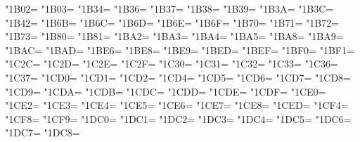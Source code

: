 \XeTeXcharclass"1B02=\KclassNum
\XeTeXcharclass"1B03=\KclassNum
\XeTeXcharclass"1B34=\KclassNum
\XeTeXcharclass"1B36=\KclassNum
\XeTeXcharclass"1B37=\KclassNum
\XeTeXcharclass"1B38=\KclassNum
\XeTeXcharclass"1B39=\KclassNum
\XeTeXcharclass"1B3A=\KclassNum
\XeTeXcharclass"1B3C=\KclassNum
\XeTeXcharclass"1B42=\KclassNum
\XeTeXcharclass"1B6B=\KclassNum
\XeTeXcharclass"1B6C=\KclassNum
\XeTeXcharclass"1B6D=\KclassNum
\XeTeXcharclass"1B6E=\KclassNum
\XeTeXcharclass"1B6F=\KclassNum
\XeTeXcharclass"1B70=\KclassNum
\XeTeXcharclass"1B71=\KclassNum
\XeTeXcharclass"1B72=\KclassNum
\XeTeXcharclass"1B73=\KclassNum
\XeTeXcharclass"1B80=\KclassNum
\XeTeXcharclass"1B81=\KclassNum
\XeTeXcharclass"1BA2=\KclassNum
\XeTeXcharclass"1BA3=\KclassNum
\XeTeXcharclass"1BA4=\KclassNum
\XeTeXcharclass"1BA5=\KclassNum
\XeTeXcharclass"1BA8=\KclassNum
\XeTeXcharclass"1BA9=\KclassNum
\XeTeXcharclass"1BAC=\KclassNum
\XeTeXcharclass"1BAD=\KclassNum
\XeTeXcharclass"1BE6=\KclassNum
\XeTeXcharclass"1BE8=\KclassNum
\XeTeXcharclass"1BE9=\KclassNum
\XeTeXcharclass"1BED=\KclassNum
\XeTeXcharclass"1BEF=\KclassNum
\XeTeXcharclass"1BF0=\KclassNum
\XeTeXcharclass"1BF1=\KclassNum
\XeTeXcharclass"1C2C=\KclassNum
\XeTeXcharclass"1C2D=\KclassNum
\XeTeXcharclass"1C2E=\KclassNum
\XeTeXcharclass"1C2F=\KclassNum
\XeTeXcharclass"1C30=\KclassNum
\XeTeXcharclass"1C31=\KclassNum
\XeTeXcharclass"1C32=\KclassNum
\XeTeXcharclass"1C33=\KclassNum
\XeTeXcharclass"1C36=\KclassNum
\XeTeXcharclass"1C37=\KclassNum
\XeTeXcharclass"1CD0=\KclassNum
\XeTeXcharclass"1CD1=\KclassNum
\XeTeXcharclass"1CD2=\KclassNum
\XeTeXcharclass"1CD4=\KclassNum
\XeTeXcharclass"1CD5=\KclassNum
\XeTeXcharclass"1CD6=\KclassNum
\XeTeXcharclass"1CD7=\KclassNum
\XeTeXcharclass"1CD8=\KclassNum
\XeTeXcharclass"1CD9=\KclassNum
\XeTeXcharclass"1CDA=\KclassNum
\XeTeXcharclass"1CDB=\KclassNum
\XeTeXcharclass"1CDC=\KclassNum
\XeTeXcharclass"1CDD=\KclassNum
\XeTeXcharclass"1CDE=\KclassNum
\XeTeXcharclass"1CDF=\KclassNum
\XeTeXcharclass"1CE0=\KclassNum
\XeTeXcharclass"1CE2=\KclassNum
\XeTeXcharclass"1CE3=\KclassNum
\XeTeXcharclass"1CE4=\KclassNum
\XeTeXcharclass"1CE5=\KclassNum
\XeTeXcharclass"1CE6=\KclassNum
\XeTeXcharclass"1CE7=\KclassNum
\XeTeXcharclass"1CE8=\KclassNum
\XeTeXcharclass"1CED=\KclassNum
\XeTeXcharclass"1CF4=\KclassNum
\XeTeXcharclass"1CF8=\KclassNum
\XeTeXcharclass"1CF9=\KclassNum
\XeTeXcharclass"1DC0=\KclassNum
\XeTeXcharclass"1DC1=\KclassNum
\XeTeXcharclass"1DC2=\KclassNum
\XeTeXcharclass"1DC3=\KclassNum
\XeTeXcharclass"1DC4=\KclassNum
\XeTeXcharclass"1DC5=\KclassNum
\XeTeXcharclass"1DC6=\KclassNum
\XeTeXcharclass"1DC7=\KclassNum
\XeTeXcharclass"1DC8=\KclassNum
